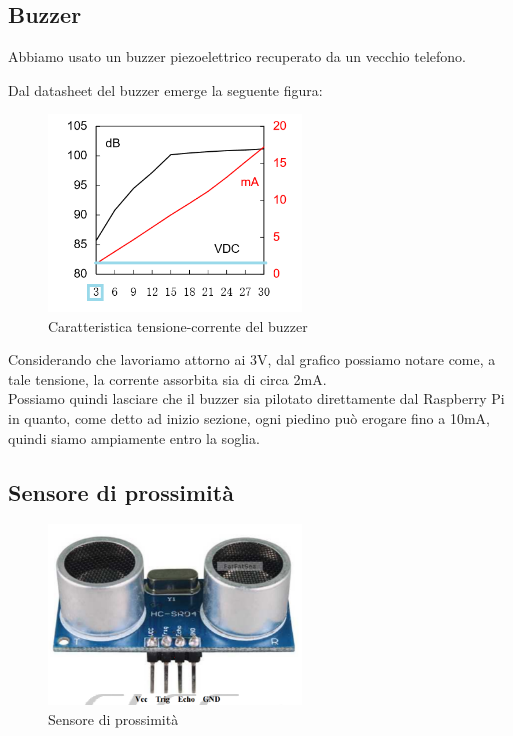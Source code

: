 \documentclass[12pt]{article}
\newcommand{\imgszland}{0.6\textwidth}
\newcommand{\raspi}{Raspberry Pi}
\begin{document}
\subsection{Buzzer}

Abbiamo usato un buzzer piezoelettrico recuperato da un vecchio telefono.

Dal datasheet del buzzer emerge la seguente figura:
\begin{figure}[h]
\includegraphics[width=\imgszland]{buzzerDS}
\centering
\caption{Caratteristica tensione-corrente del buzzer}
\label{fig:buzzerDS}
\end{figure}

Considerando che lavoriamo attorno ai 3V, dal grafico possiamo notare come, a tale tensione, la corrente assorbita sia di circa 2mA.\\
Possiamo quindi lasciare che il buzzer sia pilotato direttamente dal \raspi{} in quanto, come detto ad inizio sezione, ogni piedino può erogare fino a 10mA, quindi siamo ampiamente entro la soglia.

\subsection{Sensore di prossimità}

\begin{figure}[h]
\includegraphics[width=\imgszland]{us_img}
\centering
\caption{Sensore di prossimità}
\label{fig:buzzerDS}
\end{figure}
\end{document}
